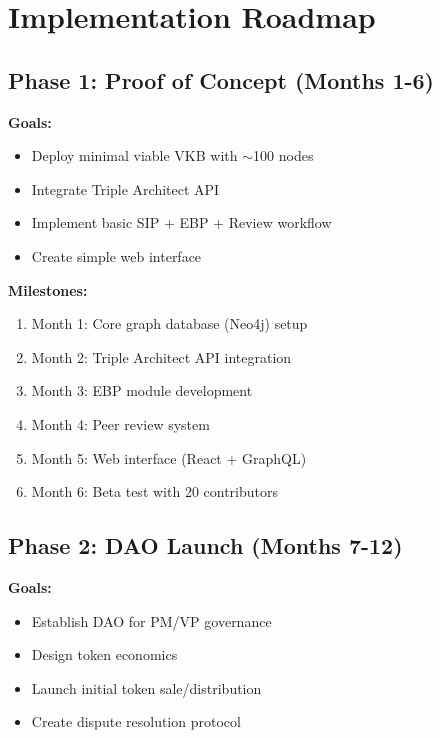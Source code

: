 \documentclass[11pt,a4paper]{article}
\theoremstyle{definition}
\theoremstyle{remark}
\newcommand{\VKB}{\textsc{VKB}}
\newcommand{\SIP}{\textsc{SIP}}
\newcommand{\EBP}{\textsc{EBP}}
\newcommand{\DAO}{\textsc{DAO}}
\begin{document}
\section{Implementation Roadmap}

\subsection{Phase 1: Proof of Concept (Months 1-6)}

\textbf{Goals:}
\begin{itemize}
    \item Deploy minimal viable \VKB{} with $\sim$100 nodes
    \item Integrate Triple Architect API
    \item Implement basic \SIP{} + \EBP{} + Review workflow
    \item Create simple web interface
\end{itemize}

\textbf{Milestones:}
\begin{enumerate}
    \item Month 1: Core graph database (Neo4j) setup
    \item Month 2: Triple Architect API integration
    \item Month 3: \EBP{} module development
    \item Month 4: Peer review system
    \item Month 5: Web interface (React + GraphQL)
    \item Month 6: Beta test with 20 contributors
\end{enumerate}

\subsection{Phase 2: DAO Launch (Months 7-12)}

\textbf{Goals:}
\begin{itemize}
    \item Establish \DAO{} for PM/VP governance
    \item Design token economics
    \item Launch initial token sale/distribution
    \item Create dispute resolution protocol
\end{itemize}
\end{document}
